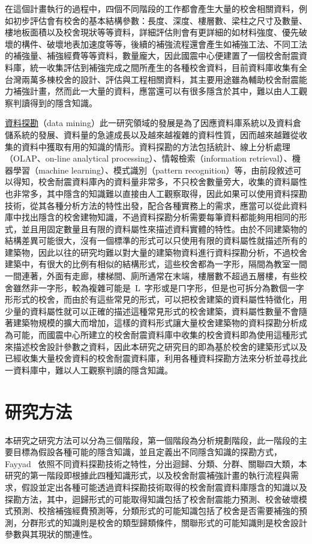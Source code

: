 在這個計畫執行的過程中，四個不同階段的工作都會產生大量的校舍相關資料，例如初步評估會有校舍的基本結構參數：長度、深度、樓層數、梁柱之尺寸及數量、樓地板面積以及校舍現狀等等資料，詳細評估則會有更詳細的如材料強度、優先破壞的構件、破壞地表加速度等等，後續的補強流程還會產生如補強工法、不同工法的補強量、補強經費等等資料，數量龐大，因此國震中心便建置了一個校舍耐震資料庫，統一收集評估到補強完成之間所產生的各種校舍資料，目前資料庫收集有全台灣兩萬多棟校舍的設計、評估與工程相關資料，其主要用途雖為輔助校舍耐震能力補強計畫，然而此一大量的資料，應當還可以有很多隱含於其中，難以由人工觀察判讀得到的隱含知識。

\underline{資料探勘}（data mining）此一研究領域的發展是為了因應資料庫系統以及資料倉儲系統的發展、資料量的急遽成長以及越來越複雜的資料性質，因而越來越難從收集的資料中獲取有用的知識的情形。資料探勘的方法包括統計、線上分析處理（OLAP、on-line analytical processing）、情報檢索（information retrieval）、機器學習（machine learning）、模式識別（pattern recognition）等，由前段敘述可以得知，校舍耐震資料庫內的資料量非常多，不只校舍數量旁大，收集的資料屬性也非常多，其中隱含的知識難以直接由人工觀察取得，因此如果可以使用資料探勘技術，從其各種分析方法的特性出發，配合各種實務上的需求，應當可以從此資料庫中找出隱含的校舍建物知識，不過資料探勘分析需要每筆資料都能夠用相同的形式，並且用固定數量且有限的資料屬性來描述資料實體的特性。由於不同建築物的結構差異可能很大，沒有一個標準的形式可以只使用有限的資料屬性就描述所有的建築物，因此以往的研究均難以對大量的建築物資料進行資料探勘分析，不過校舍建築中，有很大的比例有相似的結構形式，這些校舍都為一字形，隔間為教室一間一間連著，外面有走廊，樓梯間、廁所通常在末端，樓層數不超過五層樓，有些校舍雖然非一字形，較為複雜可能是~L~字形或是ㄇ字形，但是也可拆分為數個一字形形式的校舍，而由於有這些常見的形式，可以把校舍建築的資料屬性特徵化，用少量的資料屬性就可以正確的描述這種常見形式的校舍建築，資料屬性數量不會隨著建築物規模的擴大而增加，這樣的資料形式讓大量校舍建築物的資料探勘分析成為可能，而國震中心所建立的校舍耐震資料庫中收集的校舍資料即為使用這種形式來描述校舍設計參數之資料，因此本研究之研究目的即為基於校舍的建築形式以及已經收集大量校舍資料的校舍耐震資料庫，利用各種資料探勘方法來分析並尋找此一資料庫中，難以人工觀察判讀的隱含知識。

\section{研究方法}

本研究之研究方法可以分為三個階段，第一個階段為分析規劃階段，此一階段的主要目標為假設各種可能的隱含知識，並且定義出不同隱含知識的探勘方式，Fayyad~\cite{fayyad1996data} 依照不同資料探勘技術之特性，分出迴歸、分類、分群、關聯四大類，本研究的第一階段即根據此四種知識形式，以及校舍耐震補強計畫的執行流程與需求，假設並定出各種可能透過資料探勘技術取得的校舍耐震資料庫隱含的知識以及探勘方法，其中，迴歸形式的可能取得知識包括了校舍耐震能力預測、校舍破壞模式預測、校捨補強經費預測等，分類形式的可能知識包括了校舍是否需要補強的預測，分群形式的知識則是校舍的類型歸類條件，關聯形式的可能知識則是校舍設計參數與其現狀的關連性。


